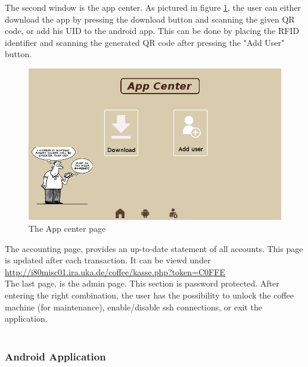 \documentclass[12pt]{article}
\begin{document}
   The second window is the app center. As pictured in figure \ref{fig:android_page}, the user can either download the app by pressing the download button and scanning the given QR code, 
   or add his UID to the android app. This can be done by placing the RFID identifier and scanning the generated QR code after pressing the "Add User" button.\\
   \begin{figure}[H]
   \centering
   \includegraphics[width=1.0\textwidth]{./images/android_page}
   \captionsetup{justification=centering}
   \caption{The App center page}
   \label{fig:android_page}
  \end{figure}
  
   The accounting page, provides an up-to-date statement of all accounts. This page is updated after each transaction.
   It can be viewd under \url{http://i80misc01.ira.uka.de/coffee/kasse.php?token=C0FFE}\\
   
   The last page, is the admin page. This section is password protected. 
   After entering the right combination, the user has the possibility to unlock the coffee machine (for maintenance), enable/disable ssh connections, or exit the application.\\~\\

   \subsubsection{Android Application} \label{sec:android}
  
\end{document}
